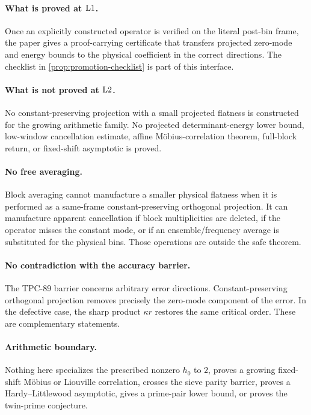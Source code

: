 \paragraph{What is proved at \(\mathrm{L1}\).}
Once an explicitly constructed operator is verified on the literal
post-bin frame, the paper gives a proof-carrying certificate that
transfers projected zero-mode and energy bounds to the physical
coefficient in the correct directions.  The checklist in
\cref{prop:promotion-checklist} is part of this interface.

\paragraph{What is not proved at \(\mathrm{L2}\).}
No constant-preserving projection with a small projected flatness is
constructed for the growing arithmetic family.  No projected
determinant-energy lower bound, low-window cancellation estimate,
affine M{\"o}bius-correlation theorem, full-block return, or
fixed-shift asymptotic is proved.

\paragraph{No free averaging.}
Block averaging cannot manufacture a smaller physical flatness when
it is performed as a same-frame constant-preserving orthogonal
projection.  It can manufacture apparent cancellation if block
multiplicities are deleted, if the operator misses the constant
mode, or if an ensemble/frequency average is substituted for the
physical bins.  Those operations are outside the safe theorem.

\paragraph{No contradiction with the accuracy barrier.}
The TPC-89 barrier concerns arbitrary error directions.
Constant-preserving orthogonal projection removes precisely the
zero-mode component of the error.  In the defective case, the sharp
product \(\kappa r\) restores the same critical order.  These are
complementary statements.

\paragraph{Arithmetic boundary.}
Nothing here specializes the prescribed nonzero \(h_0\) to \(2\),
proves a growing fixed-shift M{\"o}bius or Liouville correlation,
crosses the sieve parity barrier, proves a Hardy--Littlewood
asymptotic, gives a prime-pair lower bound, or proves the twin-prime
conjecture.

